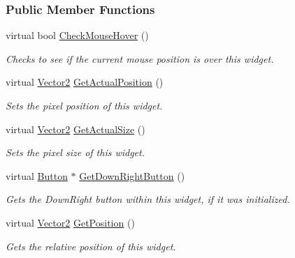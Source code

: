 \subsubsection*{Public Member Functions}
\begin{DoxyCompactItemize}
\item 
virtual bool \hyperlink{classphys_1_1UI_1_1Scrollbar_a8afdd63e36a7fdc15bd8660d9800f2c5}{CheckMouseHover} ()
\begin{DoxyCompactList}\small\item\em Checks to see if the current mouse position is over this widget. \item\end{DoxyCompactList}\item 
virtual \hyperlink{classphys_1_1Vector2}{Vector2} \hyperlink{classphys_1_1UI_1_1Scrollbar_a73337985c0f1f173e253c88705ae5d6e}{GetActualPosition} ()
\begin{DoxyCompactList}\small\item\em Sets the pixel position of this widget. \item\end{DoxyCompactList}\item 
virtual \hyperlink{classphys_1_1Vector2}{Vector2} \hyperlink{classphys_1_1UI_1_1Scrollbar_a2b3d791cbbe4c787f284d8b12a0edf27}{GetActualSize} ()
\begin{DoxyCompactList}\small\item\em Sets the pixel size of this widget. \item\end{DoxyCompactList}\item 
virtual \hyperlink{classphys_1_1UI_1_1Button}{Button} $\ast$ \hyperlink{classphys_1_1UI_1_1Scrollbar_abf733d00087050d575fca1abc2d4ba0e}{GetDownRightButton} ()
\begin{DoxyCompactList}\small\item\em Gets the DownRight button within this widget, if it was initialized. \item\end{DoxyCompactList}\item 
virtual \hyperlink{classphys_1_1Vector2}{Vector2} \hyperlink{classphys_1_1UI_1_1Scrollbar_ad049af26ff2247cfcd988cb5639fa003}{GetPosition} ()
\begin{DoxyCompactList}\small\item\em Gets the relative position of this widget. \item\end{DoxyCompactList}\item 

\end{DoxyCompactItemize}
